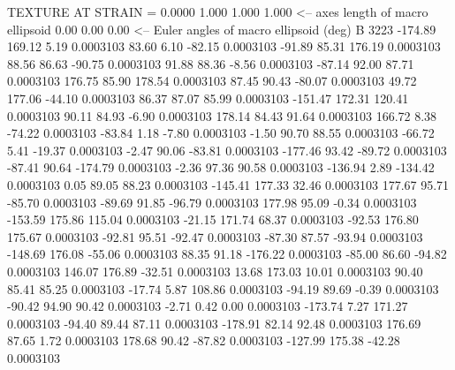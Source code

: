 TEXTURE AT STRAIN =    0.0000
   1.000   1.000   1.000  <-- axes length of macro ellipsoid
    0.00    0.00    0.00  <-- Euler angles of macro ellipsoid (deg)
B      3223
     -174.89      169.12        5.19     0.0003103
       83.60        6.10      -82.15     0.0003103
      -91.89       85.31      176.19     0.0003103
       88.56       86.63      -90.75     0.0003103
       91.88       88.36       -8.56     0.0003103
      -87.14       92.00       87.71     0.0003103
      176.75       85.90      178.54     0.0003103
       87.45       90.43      -80.07     0.0003103
       49.72      177.06      -44.10     0.0003103
       86.37       87.07       85.99     0.0003103
     -151.47      172.31      120.41     0.0003103
       90.11       84.93       -6.90     0.0003103
      178.14       84.43       91.64     0.0003103
      166.72        8.38      -74.22     0.0003103
      -83.84        1.18       -7.80     0.0003103
       -1.50       90.70       88.55     0.0003103
      -66.72        5.41      -19.37     0.0003103
       -2.47       90.06      -83.81     0.0003103
     -177.46       93.42      -89.72     0.0003103
      -87.41       90.64     -174.79     0.0003103
       -2.36       97.36       90.58     0.0003103
     -136.94        2.89     -134.42     0.0003103
        0.05       89.05       88.23     0.0003103
     -145.41      177.33       32.46     0.0003103
      177.67       95.71      -85.70     0.0003103
      -89.69       91.85      -96.79     0.0003103
      177.98       95.09       -0.34     0.0003103
     -153.59      175.86      115.04     0.0003103
      -21.15      171.74       68.37     0.0003103
      -92.53      176.80      175.67     0.0003103
      -92.81       95.51      -92.47     0.0003103
      -87.30       87.57      -93.94     0.0003103
     -148.69      176.08      -55.06     0.0003103
       88.35       91.18     -176.22     0.0003103
      -85.00       86.60      -94.82     0.0003103
      146.07      176.89      -32.51     0.0003103
       13.68      173.03       10.01     0.0003103
       90.40       85.41       85.25     0.0003103
      -17.74        5.87      108.86     0.0003103
      -94.19       89.69       -0.39     0.0003103
      -90.42       94.90       90.42     0.0003103
       -2.71        0.42        0.00     0.0003103
     -173.74        7.27      171.27     0.0003103
      -94.40       89.44       87.11     0.0003103
     -178.91       82.14       92.48     0.0003103
      176.69       87.65        1.72     0.0003103
      178.68       90.42      -87.82     0.0003103
     -127.99      175.38      -42.28     0.0003103
